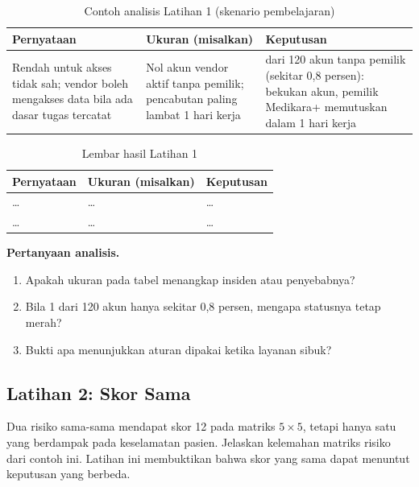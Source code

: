 \begin{table}[!htb]
  \centering\small
  \caption{Contoh analisis Latihan 1 (skenario pembelajaran)}\label{tab:ch05-lat1-contoh}
  \begin{tabularx}{\textwidth}{|>{\raggedright\arraybackslash}X|>{\raggedright\arraybackslash}X|>{\raggedright\arraybackslash}X|}
    \hline
    \textbf{Pernyataan} & \textbf{Ukuran (misalkan)} & \textbf{Keputusan} \\ \hline
    Rendah untuk akses tidak sah; vendor boleh mengakses data bila ada dasar tugas tercatat & Nol akun
    vendor aktif tanpa pemilik; pencabutan paling lambat 1 hari kerja & 1 dari 120 akun tanpa pemilik
    (sekitar 0,8 persen): bekukan akun, pemilik Medikara+ memutuskan dalam 1 hari kerja \\ \hline
  \end{tabularx}
\end{table}

\begin{table}[!htb]
  \centering\small
  \caption{Lembar hasil Latihan 1}\label{tab:ch05-lat1-hasil}
  \begin{tabularx}{\textwidth}{|>{\raggedright\arraybackslash}X|>{\raggedright\arraybackslash}X|>{\raggedright\arraybackslash}X|}
    \hline
    \textbf{Pernyataan} & \textbf{Ukuran (misalkan)} & \textbf{Keputusan} \\ \hline
    \dots & \dots & \dots \\ \hline
    \dots & \dots & \dots \\ \hline
  \end{tabularx}
\end{table}

\textbf{Pertanyaan analisis.}
\begin{enumerate}
  \item Apakah ukuran pada tabel menangkap insiden atau penyebabnya?
  \item Bila 1 dari 120 akun hanya sekitar 0,8 persen, mengapa statusnya tetap merah?
  \item Bukti apa menunjukkan aturan dipakai ketika layanan sibuk?
\end{enumerate}

\subsection*{Latihan 2: Skor Sama}

Dua risiko sama-sama mendapat skor 12 pada matriks $5 \times 5$, tetapi hanya satu yang berdampak
pada keselamatan pasien. Jelaskan kelemahan matriks risiko dari contoh ini. Latihan ini membuktikan
bahwa skor yang sama dapat menuntut keputusan yang berbeda.

